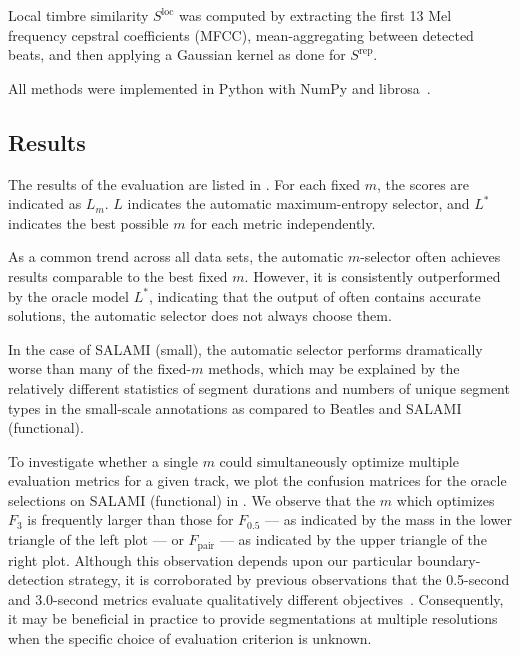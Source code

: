 \documentclass{article}
\begin{document}
Local timbre similarity $S^\text{loc}$ was computed by extracting the first 13 Mel
frequency cepstral coefficients (MFCC), mean-aggregating between detected beats, and
then applying a Gaussian kernel as done for $S^\text{rep}$.

All methods were implemented in Python with NumPy and 
librosa~\cite{van2011numpy, librosa}.

\subsection{Results}
The results of the evaluation are listed in
.  For each fixed $m$, 
the scores are indicated as $L_m$.  $L$ indicates the automatic
maximum-entropy selector, and $L^*$ indicates the best possible $m$ for each metric
independently.

As a common trend across all data sets, the automatic $m$-selector often achieves results
comparable to the best fixed $m$.  However, it is consistently outperformed by the 
oracle model $L^*$, indicating that the output of  often contains 
accurate solutions, the automatic selector does not always choose them.

In the case of SALAMI (small), the automatic selector performs dramatically worse than
many of the fixed-$m$ methods, which may be explained by the relatively different
statistics of segment durations and numbers of unique segment types in the small-scale
annotations as compared to Beatles and SALAMI (functional).

To investigate whether a single $m$ could simultaneously optimize multiple evaluation
metrics for a given track, we plot the confusion matrices for the oracle selections on
SALAMI (functional) in .  We observe that the
$m$ which optimizes $F_3$ is frequently larger than those for $F_{0.5}$ --- as indicated by
the mass in the lower triangle of the left plot --- or $F_\text{pair}$  --- as 
indicated by the upper triangle of the right plot.  
Although this observation depends upon our particular boundary-detection
strategy, it is corroborated by previous observations that the 0.5-second and 
3.0-second metrics evaluate qualitatively different objectives~\cite{smith2013meta}.
Consequently, it may be beneficial in practice to provide segmentations at multiple 
resolutions when the specific choice of evaluation criterion is unknown.
\end{document}
